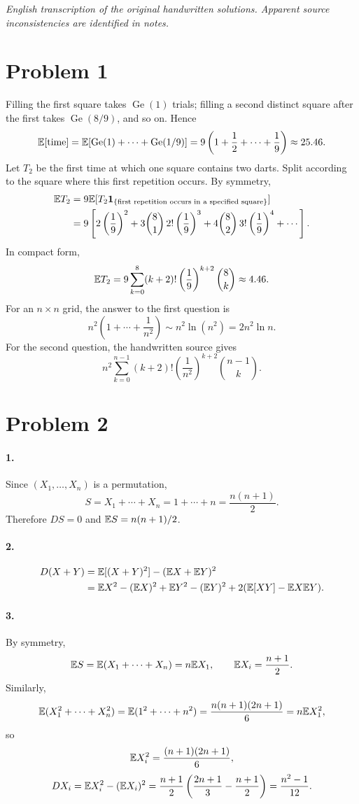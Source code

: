 \documentclass[11pt,a4paper]{article}
\begin{document}
\noindent\emph{English transcription of the original handwritten solutions. Apparent source inconsistencies are identified in notes.}

\section*{Problem 1}
Filling the first square takes $\operatorname{Ge}(1)$ trials; filling a second distinct square after the first takes $\operatorname{Ge}(8/9)$, and so on. Hence
\[
\mathbb {E}[\text{time}]=\mathbb {E}[\operatorname{Ge}(1)+\cdots+\operatorname{Ge}(1/9)]
=9\left(1+\frac12+\cdots+\frac19\right)\approx25.46.
\]
Let $T_2$ be the first time at which one square contains two darts. Split according to the square where this first repetition occurs. By symmetry,
\begin{align*}
\mathbb {E} T_2
&=9\mathbb {E}[T_2\mathbf1_{\{\text{first repetition occurs in a specified square}\}}]\\
&=9\left[2\left(\frac19\right)^2
+3\binom81\,2!\left(\frac19\right)^3
+4\binom82\,3!\left(\frac19\right)^4+\cdots\right].
\end{align*}
In compact form,
\[
\mathbb {E} T_2=9\sum_{k=0}^8(k+2)!\left(\frac19\right)^{k+2}\binom8k
\approx4.46.
\]
For an $n\times n$ grid, the answer to the first question is
\[
n^2\left(1+\cdots+\frac1{n^2}\right)\sim n^2\ln(n^2)=2n^2\ln n.
\]
For the second question, the handwritten source gives
\[
n^2\sum_{k=0}^{n-1}(k+2)!\left(\frac1{n^2}\right)^{k+2}\binom{n-1}k.\tag{Note 1}
\]

\section*{Problem 2}
\paragraph{1.} Since $(X_1,\ldots,X_n)$ is a permutation,
\[
S=X_1+\cdots+X_n=1+\cdots+n=\frac{n(n+1)}2.
\]
Therefore $DS=0$ and $\mathbb {E} S=n(n+1)/2$.
\paragraph{2.}
\begin{align*}
D(X+Y)&=\mathbb {E}[(X+Y)^2]-(\mathbb {E} X+\mathbb {E} Y)^2\\
&=\mathbb {E} X^2-(\mathbb {E} X)^2+\mathbb {E} Y^2-(\mathbb {E} Y)^2
+2(\mathbb {E}[XY]-\mathbb {E} X\mathbb {E} Y).
\end{align*}
\paragraph{3.} By symmetry,
\[
\mathbb {E} S=\mathbb {E}(X_1+\cdots+X_n)=n\mathbb {E} X_1,
\qquad\mathbb {E} X_i=\frac{n+1}2.
\]
Similarly,
\[
\mathbb {E}(X_1^2+\cdots+X_n^2)=\mathbb {E}(1^2+\cdots+n^2)
=\frac{n(n+1)(2n+1)}6=n\mathbb {E} X_1^2,
\]
so
\[
\mathbb {E} X_i^2=\frac{(n+1)(2n+1)}6,
\]
\[
DX_i=\mathbb {E} X_i^2-(\mathbb {E} X_i)^2
=\frac{n+1}2\left(\frac{2n+1}3-\frac{n+1}2\right)=\frac{n^2-1}{12}.
\]
\end{document}
